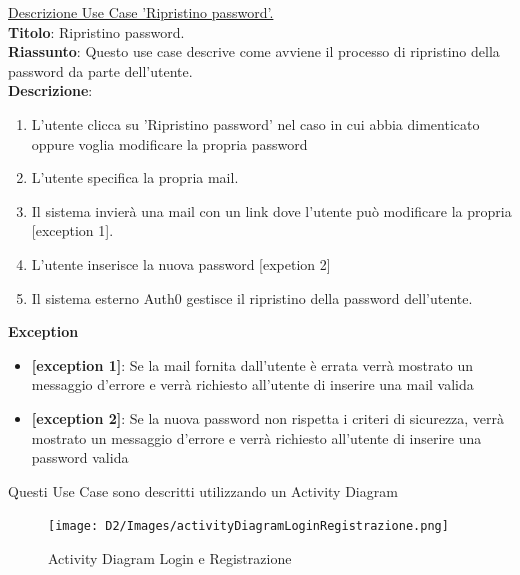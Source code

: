 \documentclass{article}
\begin{document}
    \noindent\underline{Descrizione Use Case 'Ripristino password'.}\\
    \textbf{Titolo}: Ripristino password.\\
    \textbf{Riassunto}: Questo use case descrive come avviene il processo di ripristino della password da parte dell'utente.\\
    \textbf{Descrizione}: 
        \begin{enumerate}
        \item L'utente clicca su 'Ripristino password' nel caso in cui abbia dimenticato oppure voglia modificare la propria password
        \item L'utente specifica la propria mail.
        \item Il sistema invierà una mail con un link dove l'utente può modificare la propria  [exception 1].
        \item L'utente inserisce la nuova password [expetion 2]
        \item Il sistema esterno Auth0 gestisce il ripristino della password dell'utente.
    \end{enumerate}
        \textbf{Exception}
    \begin{itemize}
        \item \textbf{[exception 1]}: Se la mail fornita dall'utente è errata verrà mostrato un messaggio d'errore e verrà richiesto all'utente di inserire una mail valida
        \item \textbf{[exception 2]}: Se la nuova password non rispetta i criteri di sicurezza, verrà mostrato un messaggio d'errore e verrà richiesto all'utente di inserire una password valida
    \end{itemize}

    \noindent Questi Use Case sono descritti utilizzando un Activity Diagram
    \begin{figure}[H]
    \centering
    \texttt{[image: D2/Images/activityDiagramLoginRegistrazione.png]}
    \caption{Activity Diagram Login e Registrazione}
\end{figure}
\end{document}
